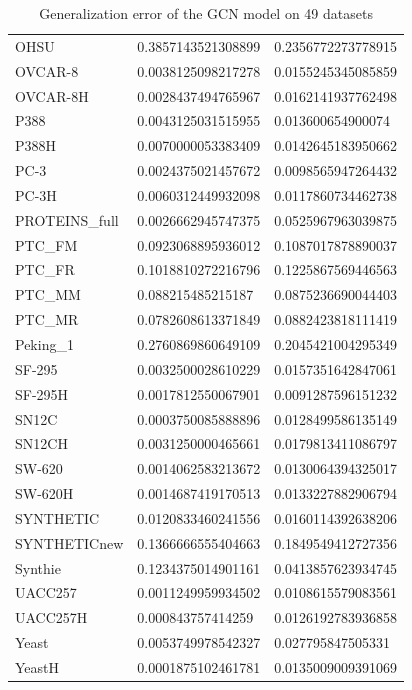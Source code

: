 \begin{table}[!ht]
\begin{tabular}{p{3.5cm}|p{5cm}p{5cm}}
        OHSU & 0.3857143521308899 & 0.2356772273778915 \\ 
        OVCAR-8 & 0.0038125098217278 & 0.0155245345085859 \\ 
        OVCAR-8H & 0.0028437494765967 & 0.0162141937762498 \\ 
        P388 & 0.0043125031515955 & 0.013600654900074 \\ 
        P388H & 0.0070000053383409 & 0.0142645183950662 \\ 
        PC-3 & 0.0024375021457672 & 0.0098565947264432 \\ 
        PC-3H & 0.0060312449932098 & 0.0117860734462738 \\ 
        PROTEINS\_full & 0.0026662945747375 & 0.0525967963039875 \\ 
        PTC\_FM & 0.0923068895936012 & 0.1087017878890037 \\ 
        PTC\_FR & 0.1018810272216796 & 0.1225867569446563 \\ 
        PTC\_MM & 0.088215485215187 & 0.0875236690044403 \\ 
        PTC\_MR & 0.0782608613371849 & 0.0882423818111419 \\ 
        Peking\_1 & 0.2760869860649109 & 0.2045421004295349 \\ 
        SF-295 & 0.0032500028610229 & 0.0157351642847061 \\ 
        SF-295H & 0.0017812550067901 & 0.0091287596151232 \\ 
        SN12C & 0.0003750085888896 & 0.0128499586135149 \\ 
        SN12CH & 0.0031250000465661 & 0.0179813411086797 \\ 
        SW-620 & 0.0014062583213672 & 0.0130064394325017 \\ 
        SW-620H & 0.0014687419170513 & 0.0133227882906794 \\ 
        SYNTHETIC & 0.0120833460241556 & 0.0160114392638206 \\ 
        SYNTHETICnew & 0.1366666555404663 & 0.1849549412727356 \\ 
        Synthie & 0.1234375014901161 & 0.0413857623934745 \\ 
        UACC257 & 0.0011249959934502 & 0.0108615579083561 \\ 
        UACC257H & 0.000843757414259 & 0.0126192783936858 \\ 
        Yeast & 0.0053749978542327 & 0.027795847505331 \\ 
        YeastH & 0.0001875102461781 & 0.0135009009391069 \\ 
    \end{tabular}
    \caption{Generalization error of the GCN model on 49 datasets}
    \label{tab:ge_gcn} %
\end{table}

